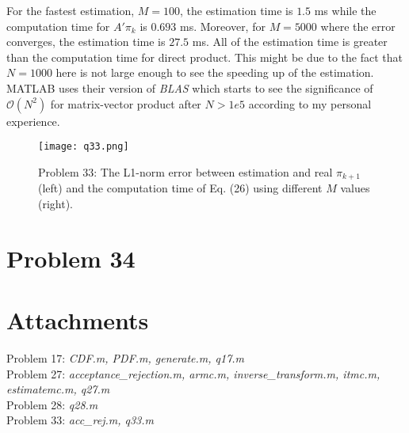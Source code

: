 \documentclass[a4paper, 11pt]{article}
\begin{document}
For the fastest estimation, $M=100$, the estimation time is $1.5$ ms while the computation time for $A'\pi_k$ is $0.693$ ms. Moreover, for $M=5000$ where the error converges, the estimation time is $27.5$ ms. All of the estimation time is greater than the computation time for direct product. This might be due to the fact that $N=1000$ here is not large enough to see the speeding up of the estimation. MATLAB uses their version of \textit{BLAS} which starts to see the significance of $\mathcal{O}(N^2)$ for matrix-vector product after $N>1e5$ according to my personal experience. 


\begin{figure}
	\begin{center}
		\texttt{[image: q33.png]}
		\caption{Problem 33: The L1-norm error between estimation and real $\pi_{k+1}$ (left) and the computation time of Eq. (26) using different $M$ values (right).  }
	\end{center}
\end{figure}


\section*{Problem 34}






\section*{Attachments}
	Problem 17: \textit{CDF.m, PDF.m, generate.m, q17.m} \\
	Problem 27: \textit{acceptance\_rejection.m, armc.m, inverse\_transform.m, itmc.m, estimatemc.m, q27.m}\\
	Problem 28: \textit{q28.m}\\
	Problem 33: \textit{acc\_rej.m, q33.m}\\

\end{document}
